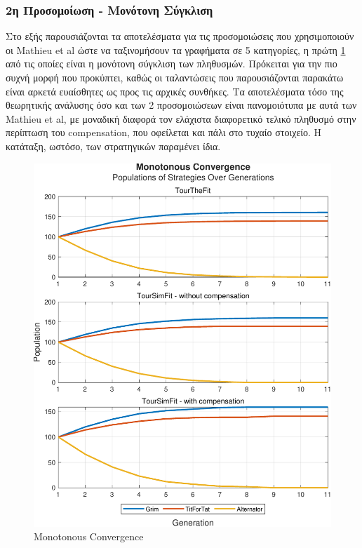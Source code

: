 \documentclass[12pt]{article}
\begin{document}
\subsubsection{2η Προσομοίωση - Μονότονη Σύγκλιση}
Στο εξής παρουσιάζονται τα αποτελέσματα για τις προσομοιώσεις που χρησιμοποιούν οι Mathieu et al ώστε να ταξινομήσουν τα γραφήματα σε 5 κατηγορίες, η πρώτη \ref{fig:Monotonous Convergence} από τις οποίες είναι η μονότονη σύγκλιση των πληθυσμών. Πρόκειται για την πιο συχνή μορφή που προκύπτει, καθώς οι ταλαντώσεις που παρουσιάζονται παρακάτω είναι αρκετά ευαίσθητες ως προς τις αρχικές συνθήκες. Τα αποτελέσματα τόσο της θεωρητικής ανάλυσης όσο και των 2 προσομοιώσεων είναι πανομοιότυπα με αυτά των Mathieu et al, με μοναδική διαφορά τον ελάχιστα διαφορετικό τελικό πληθυσμό στην περίπτωση του compensation, που οφείλεται και πάλι στο τυχαίο στοιχείο. Η κατάταξη, ωστόσο, των στρατηγικών παραμένει ίδια.
	\begin{figure}[h]
	      \centering
	      \includegraphics[scale=0.8]{Monotonous Convergence.pdf}
	      \caption{Monotonous Convergence}
	      \label{fig:Monotonous Convergence}
	\end{figure}
\end{document}
